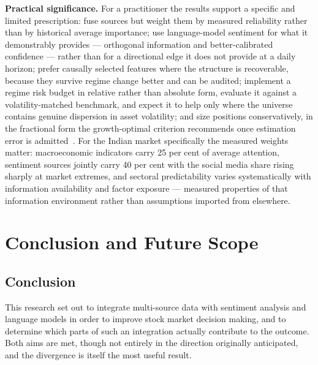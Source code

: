 \textbf{Practical significance.} For a practitioner the results support a specific and limited
prescription: fuse sources but weight them by measured reliability rather than by historical
average importance; use language-model sentiment for what it demonstrably provides ---
orthogonal information and better-calibrated confidence --- rather than for a directional edge
it does not provide at a daily horizon; prefer causally selected features where the structure is
recoverable, because they survive regime change better and can be audited; implement a regime
risk budget in relative rather than absolute form, evaluate it against a volatility-matched
benchmark, and expect it to help only where the universe contains genuine dispersion in asset
volatility; and size positions conservatively, in the fractional form the growth-optimal
criterion recommends once estimation error is admitted~\cite{kelly1956}. For the Indian market
specifically the measured weights matter: macroeconomic indicators carry 25 per cent of average
attention, sentiment sources jointly carry 40 per cent with the social media share rising
sharply at market extremes, and sectoral predictability varies systematically with information
availability and factor exposure --- measured properties of that information environment rather
than assumptions imported from elsewhere.

\chapter{Conclusion and Future Scope}

\section{Conclusion}

This research set out to integrate multi-source data with sentiment analysis and language
models in order to improve stock market decision making, and to determine which parts of such
an integration actually contribute to the outcome. Both aims are met, though not entirely in
the direction originally anticipated, and the divergence is itself the most useful result.

